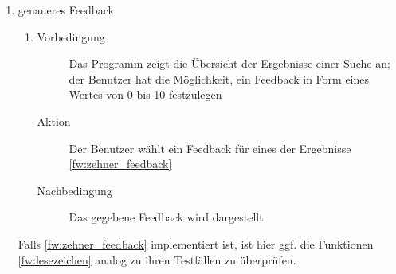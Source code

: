 \begin{enumerate} [label=\bfseries /TSW \arabic*0/, leftmargin=*]
	\item genaueres Feedback \label{ts:zehner_feedback}
	\begin{enumerate}[leftmargin=0pt]
		\item
		\begin{description}
			\item[Vorbedingung] Das Programm zeigt die Übersicht der Ergebnisse einer Suche an; der Benutzer hat die Möglichkeit, ein Feedback in Form eines Wertes von 0 bis 10 festzulegen
			\item[Aktion] Der Benutzer wählt ein Feedback für eines der Ergebnisse \ref{fw:zehner_feedback}
			\item[Nachbedingung] Das gegebene Feedback wird dargestellt
		\end{description}
	\end{enumerate}
	Falls \ref{fw:zehner_feedback} implementiert ist, ist hier ggf. die Funktionen \ref{fw:lesezeichen} analog zu ihren Testfällen zu überprüfen.
\end{enumerate}

